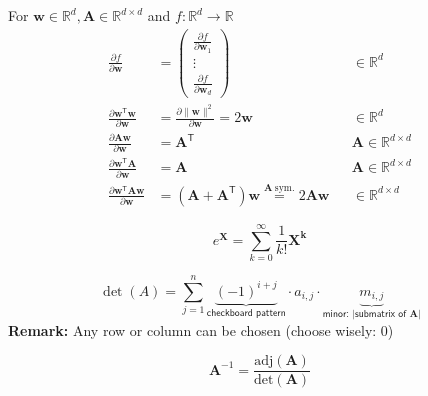 \newpar{}
For $\mathbf{w}\in \mathbb{R}^d, \mathbf{A}\in \mathbb{R}^{d\times d}$ and $ f: \mathbb{R}^d\to \mathbb{R}$
\noindent\begin{align*}
    \frac{\partial f}{\partial \mathbf{w}}                                  & =
    \begin{pmatrix}\frac{\partial f}{\partial \mathbf{w}_1} \\
        \vdots                                   \\
        \frac{\partial f}{\partial \mathbf{w}_d}
    \end{pmatrix}  &                                                                                                                 & \in \mathbb{R}^d                                                                                                 \\[2em]
    \frac{\partial \mathbf{w}^{\mathsf{T}}\mathbf{w}}{\partial \mathbf{w}}  & =\frac{\partial\|\mathbf{w}\|^2}{\partial \mathbf{w}}=2\mathbf{w}                                               &                  & \in \mathbb{R}^d                     \\
    \frac{\partial \mathbf{A}\mathbf{w}}{\partial \mathbf{w}}               & ={\mathbf{A}}^{\mathsf{T}}                                                                                      &                  & \mathbf{A}\in \mathbb{R}^{d\times d} \\
    \frac{\partial \mathbf{w}^{\mathsf{T}}\mathbf{A}}{\partial \mathbf{w}}  & = \mathbf{A}                                                                                                    &                  & \mathbf{A}\in \mathbb{R}^{d\times d} \\
    \frac{\partial \mathbf{w}^{\mathsf{T}}\mathbf{Aw}}{\partial \mathbf{w}} & = \left(\mathbf{A}+\mathbf{A}^{\mathsf{T}}\right)\mathbf{w} \overset{\mathbf{A}\ \mathrm{sym.}}{=} 2\mathbf{Aw} &                  & \in \mathbb{R}^{d\times d}
\end{align*}

\newpar{}
\begin{equation*}
    e^{\mathbf{X}} = \sum_{k=0}^{\infty}\frac{1}{k!}\mathbf{X^k}
\end{equation*}

\newpar{}
\noindent\begin{equation*}
    \det(A)=\sum_{j=1}^n \underbrace{{(-1)}^{i+j}}_{\textsf{checkboard pattern}}\cdot a_{i,j}\cdot\underbrace{m_{i,j}}_{\textsf{minor: |submatrix of }\mathbf{A}|}
\end{equation*}
\textbf{Remark:} Any row or column can be chosen (choose wisely: 0)

\newpar{}

\begin{equation*}
    \mathbf{A}^{-1}  = \frac{\text{adj}(\mathbf{A})}{\text{det}(\mathbf{A})}
\end{equation*}